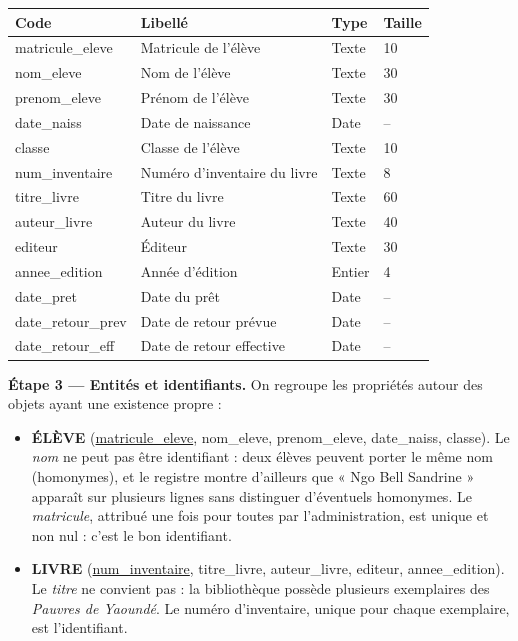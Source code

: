 \documentclass[11pt]{article}
\begin{document}
\begin{exoresolu}
\begin{center}
\begin{tabularx}{\linewidth}{|l|X|l|l|}
\hline
\rowcolor{popblueL}
\textbf{Code} & \textbf{Libellé} & \textbf{Type} & \textbf{Taille} \\
\hline
matricule\_eleve & Matricule de l'élève & Texte & 10 \\
\hline
nom\_eleve & Nom de l'élève & Texte & 30 \\
\hline
prenom\_eleve & Prénom de l'élève & Texte & 30 \\
\hline
date\_naiss & Date de naissance & Date & -- \\
\hline
classe & Classe de l'élève & Texte & 10 \\
\hline
num\_inventaire & Numéro d'inventaire du livre & Texte & 8 \\
\hline
titre\_livre & Titre du livre & Texte & 60 \\
\hline
auteur\_livre & Auteur du livre & Texte & 40 \\
\hline
editeur & Éditeur & Texte & 30 \\
\hline
annee\_edition & Année d'édition & Entier & 4 \\
\hline
date\_pret & Date du prêt & Date & -- \\
\hline
date\_retour\_prev & Date de retour prévue & Date & -- \\
\hline
date\_retour\_eff & Date de retour effective & Date & -- \\
\hline
\end{tabularx}
\end{center}

\textbf{Étape 3 — Entités et identifiants.} On regroupe les propriétés autour des objets ayant une existence propre :

\begin{itemize}
\item \textbf{ÉLÈVE} (\underline{matricule\_eleve}, nom\_eleve, prenom\_eleve, date\_naiss, classe). Le \emph{nom} ne peut pas être identifiant : deux élèves peuvent porter le même nom (homonymes), et le registre montre d'ailleurs que « Ngo Bell Sandrine » apparaît sur plusieurs lignes sans distinguer d'éventuels homonymes. Le \emph{matricule}, attribué une fois pour toutes par l'administration, est unique et non nul : c'est le bon identifiant.
\item \textbf{LIVRE} (\underline{num\_inventaire}, titre\_livre, auteur\_livre, editeur, annee\_edition). Le \emph{titre} ne convient pas : la bibliothèque possède plusieurs exemplaires des \emph{Pauvres de Yaoundé}. Le numéro d'inventaire, unique pour chaque exemplaire, est l'identifiant.
\end{itemize}


\end{exoresolu}
\end{document}
